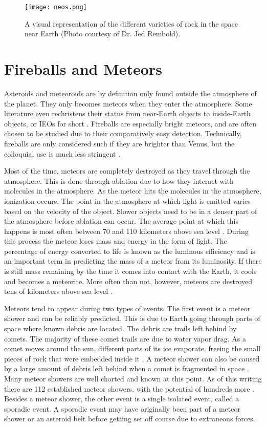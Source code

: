 \begin{figure}[ht!]
  \centering
  \texttt{[image: neos.png]}
  \caption{A visual representation of the different varieties of rock in the space near Earth (Photo courtesy of Dr. Jed Rembold).}
  \label{fig:neos}
\end{figure}


\section{Fireballs and Meteors}

Asteroids and meteoroids are by definition only found outside the atmosphere of the planet. They only becomes meteors when they enter the atmosphere. Some literature even rechristens their status from near-Earth objects to inside-Earth objects, or IEOs for short \cite{Bottke2007}. Fireballs are especially bright meteors, and are often chosen to be studied due to their comparatively easy detection. Technically, fireballs are only considered such if they are brighter than Venus, but the colloquial use is much less stringent \cite{Harbaugh2008}. 

Most of the time, meteors are completely destroyed as they travel through the atmosphere. This is done through ablation due to how they interact with molecules in the atmosphere. As the meteor hits the molecules in the atmosphere, ionization occurs. The point in the atmosphere at which light is emitted varies based on the velocity of the object. Slower objects need to be in a denser part of the atmosphere before ablation can occur. The average point at which this happens is most often between 70 and 110 kilometers above sea level \cite{Halliday1996}. During this process the meteor loses mass and energy in the form of light. The percentage of energy converted to life is known as the luminous efficiency and is an important term in predicting the mass of a meteor from its luminosity. If there is still mass remaining by the time it comes into contact with the Earth, it cools and becomes a meteorite. More often than not, however, meteors are destroyed tens of kilometers above sea level \cite{Halliday1996}.

Meteors tend to appear during two types of events. The first event is a meteor shower and can be reliably predicted. This is due to Earth going through parts of space where known debris are located. The debris are trails left behind by comets. The majority of these comet trails are due to water vapor drag. As a comet moves around the sun, different parts of its ice evaporate, freeing the small pieces of rock that were embedded inside it \cite{Whipple1951}. A meteor shower can also be caused by a large amount of debris left behind when a comet is fragmented in space \cite{Jenniskens2006}. Many meteor showers are well charted and known at this point. As of this writing there are 112 established meteor showers, with the potential of hundreds more \cite{RRudawskaZKanuchova2017}. Besides a meteor shower, the other event is a single isolated event, called a sporadic event. A sporadic event may have originally been part of a meteor shower or an asteroid belt before getting set off course due to extraneous forces.

